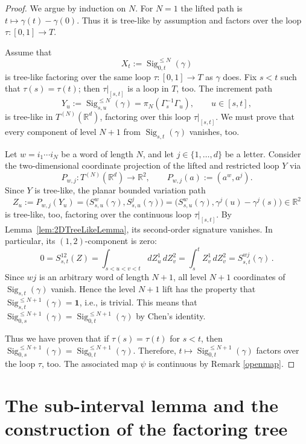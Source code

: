 \documentclass[10pt,a4paper]{amsart}
\newcommand{\R}{\mathbb{R}}
\newcommand{\Sig}{\operatorname{Sig}}
\newcommand{\id}{\mathbf{1}}
\newcommand{\proj}[1]{\pi_{#1}}
\begin{document}
\begin{proof}
We argue by induction on $N$. For $N=1$ the lifted path is $t\mapsto \gamma(t)-\gamma(0)$. Thus it is tree-like by assumption and factors over the loop $\tau:[0,1] \to T $.

Assume that
\[
  X_t:=\Sig^{\leq N}_{0,t}(\gamma)
\]
is tree-like factoring over the same loop $ \tau:[0,1] \to T$ as $\gamma$ does. Fix $s<t$ such that $\tau(s)=\tau(t)$; then $\tau|_{[s,t]}$ is a loop in $T$, too. The increment path
\[
  Y_u:=\Sig^{\leq N}_{s,u}(\gamma) = \proj{N}(\Gamma_s^{-1} \Gamma_u),
  \qquad u\in[s,t],
\]
is  tree-like  in \(T^{(N)}(\R^d)\), factoring over this loop $ \tau|_{[s,t]}$. We must prove that every component of level $N+1$ from $\Sig_{s,t}(\gamma)$ vanishes, too.

Let $ w=i_1\cdots i_N$ be a word of length $N$, and let $ j\in\{1,\ldots,d\}$ be a letter. Consider the 
two-dimensional coordinate projection of the lifted and restricted loop $Y$ via 
\[
  P_{w,j}:T^{(N)}(\R^d)\to\R^2,
  \qquad
  P_{w,j}(a):=(a^w,a^j).
\]
Since $Y$ is tree-like, the planar bounded variation path
\[
  Z_u:=P_{w,j}(Y_u)
  =\bigl(S^w_{s,u}(\gamma),S^j_{s,u}(\gamma)\bigr)
  =\bigl(S^w_{s,u}(\gamma),\gamma^j(u)-\gamma^j(s)\bigr) \in \R^2
\]
is tree-like, too,  factoring over the continuous loop $ \tau|_{[s,t]}$. By   Lemma~\ref{lem:2DTreeLikeLemma}, 
its second-order signature vanishes. In particular, its $(1,2)$-component is zero:
\[
  0
  =S^{12}_{s,t}(Z)
  =\int_{s<u<v<t} dZ^1_u\,dZ^2_v
  =\int_s^t Z^1_v\,dZ^2_v = S^{wj}_{s,t}(\gamma) \, .
\]
Since $wj$ is an arbitrary word of length $N+1$, all level $ N+1 $ coordinates of $ \Sig_{s,t}(\gamma) $ vanish. Hence the level $ N+1 $ lift has the property that $ \Sig^{\leq N+1}_{s,t}(\gamma) = \id $, i.e., is trivial. This means that $ \Sig^{\leq N+1}_{0,s}(\gamma) = \Sig^{\leq N+1}_{0,t}(\gamma) $ by Chen's identity.

Thus we have proven that if $\tau(s) = \tau(t)$ for $ s < t $, then  $ \Sig^{\leq N+1}_{0,s}(\gamma) = \Sig^{\leq N+1}_{0,t}(\gamma) $. Therefore, $ t\longmapsto \Sig^{\leq N+1}_{0,t}(\gamma) $ factors over the loop $\tau$, too. The associated map $\psi $ is continuous by Remark \ref{openmap}.
\end{proof}

\section{The sub-interval lemma and the construction of the factoring tree}\label{sec:subinterval_lemma}
\end{document}
